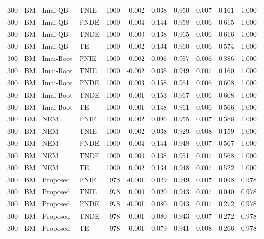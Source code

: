 \begin{longtable}{rlllrrrrrrr}
300 & BM & Imai-QB & TNIE & 1000 & -0.002 & 0.038 & 0.950 & 0.007 & 0.161 & 1.000 \\
300 & BM & Imai-QB & PNDE & 1000 & 0.004 & 0.144 & 0.958 & 0.006 & 0.615 & 1.000 \\
300 & BM & Imai-QB & TNDE & 1000 & 0.000 & 0.138 & 0.965 & 0.006 & 0.616 & 1.000 \\
300 & BM & Imai-QB & TE & 1000 & 0.002 & 0.134 & 0.960 & 0.006 & 0.574 & 1.000 \\
300 & BM & Imai-Boot & PNIE & 1000 & 0.002 & 0.096 & 0.957 & 0.006 & 0.386 & 1.000 \\
300 & BM & Imai-Boot & TNIE & 1000 & -0.002 & 0.038 & 0.949 & 0.007 & 0.160 & 1.000 \\
300 & BM & Imai-Boot & PNDE & 1000 & 0.003 & 0.158 & 0.961 & 0.006 & 0.608 & 1.000 \\
300 & BM & Imai-Boot & TNDE & 1000 & -0.001 & 0.153 & 0.967 & 0.006 & 0.608 & 1.000 \\
300 & BM & Imai-Boot & TE & 1000 & 0.001 & 0.148 & 0.961 & 0.006 & 0.566 & 1.000 \\
300 & BM & NEM & PNIE & 1000 & 0.002 & 0.096 & 0.955 & 0.007 & 0.386 & 1.000 \\
300 & BM & NEM & TNIE & 1000 & -0.002 & 0.038 & 0.929 & 0.008 & 0.159 & 1.000 \\
300 & BM & NEM & PNDE & 1000 & 0.004 & 0.144 & 0.948 & 0.007 & 0.567 & 1.000 \\
300 & BM & NEM & TNDE & 1000 & 0.000 & 0.138 & 0.951 & 0.007 & 0.568 & 1.000 \\
300 & BM & NEM & TE & 1000 & 0.002 & 0.134 & 0.948 & 0.007 & 0.522 & 1.000 \\
300 & BM & Proposed & PNIE & 978 & -0.001 & 0.029 & 0.949 & 0.007 & 0.098 & 0.978 \\
300 & BM & Proposed & TNIE & 978 & 0.000 & 0.020 & 0.943 & 0.007 & 0.040 & 0.978 \\
300 & BM & Proposed & PNDE & 978 & -0.001 & 0.080 & 0.943 & 0.007 & 0.272 & 0.978 \\
300 & BM & Proposed & TNDE & 978 & 0.001 & 0.080 & 0.943 & 0.007 & 0.272 & 0.978 \\
300 & BM & Proposed & TE & 978 & -0.001 & 0.079 & 0.941 & 0.008 & 0.266 & 0.978 \\
\bottomrule
\end{longtable}
\endgroup
